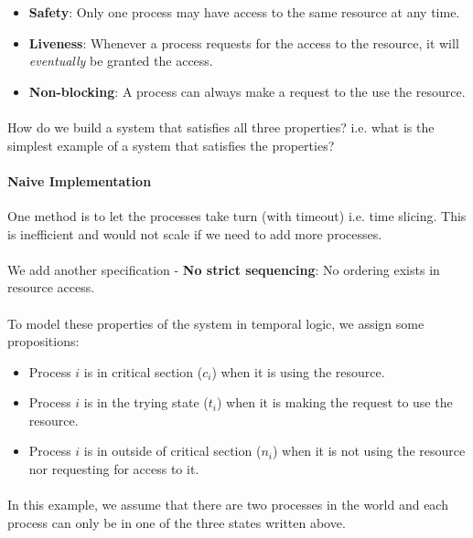 \documentclass{article}
\theoremstyle{plain}
\theoremstyle{definition}
\begin{document}
\begin{multicols}{2}
\begin{itemize}\label{list:MutexProperties}
\item \textbf{Safety}: Only one process may have access to the same resource at any time.
\item \textbf{Liveness}: Whenever a process requests for the access to the resource, it will \textit{eventually} be granted the access.
\item \textbf{Non-blocking}: A process can always make a request to the use the resource.
\end{itemize}

\paragraph{} How do we build a system that satisfies all three properties? i.e. what is the simplest example of a system that satisfies the properties?

\paragraph{Naive Implementation} One method is to let the processes take turn (with timeout) i.e. time slicing. This is inefficient and would not scale if we need to add more processes. 

\paragraph{} We add another specification - \textbf{No strict sequencing}: No ordering exists in resource access.

\paragraph{} To model these properties of the system in temporal logic, we assign some propositions:

\begin{itemize}
\item Process $i$ is in critical section ($c_i$) when it is using the resource.
\item Process $i$ is in the trying state ($t_i$) when it is making the request to use the resource.
\item Process $i$ is in outside of critical section ($n_i$) when it is not using the resource nor requesting for access to it.
\end{itemize}

\paragraph{} In this example, we assume that there are two processes in the world and each process can only be in one of the three states written above.


\end{multicols}
\end{document}
